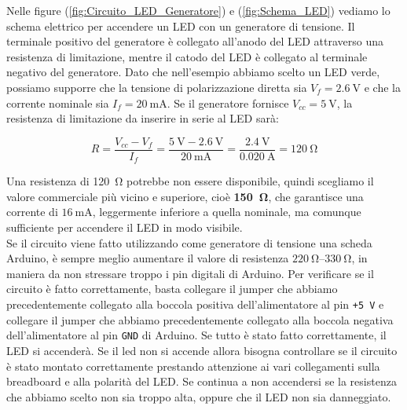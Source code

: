 Nelle figure (\ref{fig:Circuito_LED_Generatore}) e (\ref{fig:Schema_LED}) vediamo lo schema elettrico per accendere un LED con un generatore di tensione. Il terminale positivo del generatore è collegato all'anodo del LED attraverso una resistenza di limitazione, mentre il catodo del LED è collegato al terminale negativo del generatore.
Dato che nell'esempio abbiamo scelto un LED verde, possiamo supporre che la tensione di polarizzazione diretta sia $V_f = \SI{2.6}{\volt}$ e che la corrente nominale sia $I_f = \SI{20}{\milli\ampere}$. Se il generatore fornisce $V_{cc} = \SI{5}{\volt}$, la resistenza di limitazione da inserire in serie al LED sarà:

\begin{equation}
    R = \frac{V_{cc} - V_f}{I_f} = \frac{\SI{5}{\volt} - \SI{2.6}{\volt}}{\SI{20}{\milli\ampere}} = \frac{\SI{2.4}{\volt}}{\SI{0.020}{\ampere}} = \SI{120}{\ohm}
\end{equation}

Una resistenza di \SI{120}{\ohm} potrebbe non essere disponibile, quindi scegliamo il valore commerciale più vicino e superiore, cioè \textbf{\SI{150}{\ohm}}, che garantisce una corrente di $\SI{16}{\milli\ampere}$, leggermente inferiore a quella nominale, ma comunque sufficiente per accendere il LED in modo visibile.\\



Se il circuito viene fatto utilizzando come generatore di tensione una scheda Arduino, è sempre meglio aumentare il valore di resistenza  $\SIrange{220}{330}{\ohm}$, in maniera da non stressare troppo i pin digitali di Arduino. Per verificare se il circuito è fatto correttamente, basta collegare il jumper che abbiamo precedentemente collegato alla boccola positiva dell'alimentatore al pin \texttt{+5\,V} e collegare il jumper che abbiamo precedentemente collegato alla boccola negativa dell'alimentatore al pin \texttt{GND} di Arduino. Se tutto è stato fatto correttamente, il LED si accenderà. Se il led non si accende allora bisogna controllare se il circuito è stato montato correttamente prestando attenzione ai vari collegamenti sulla breadboard e alla polarità del LED. Se continua a non accendersi se la resistenza che abbiamo scelto non sia troppo alta, oppure che il LED non sia danneggiato.

